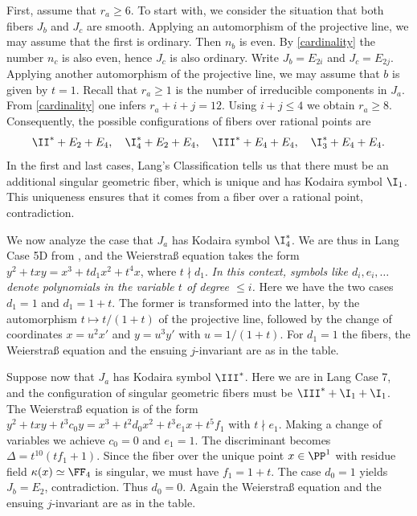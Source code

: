 First, assume that $r_a\geq 6$.
To start with, we consider the situation that both fibers $J_b$ and $J_c$ are smooth.
Applying an automorphism of the projective line, we may assume that the first is ordinary. Then $n_b$ is even.
By \eqref{cardinality} the number $n_c$ is also even, hence $J_c$ is also ordinary.
Write  $J_b=E_{2i}$ and $J_c=E_{2j}$. Applying another automorphism of the projective line,  we may assume
that $b$ is given by $t=1$. Recall that $r_a\geq 1$ is the number of irreducible components in $J_a$.
 From \eqref{cardinality} one infers $r_a+i+j=12$.
Using $i+j\leq 4$ we obtain $r_a\geq 8$.
Consequently, the possible configurations of   fibers over rational points are
$$
\II^*+E_2+E_4,\quad \I_4^*+E_2+E_4,\quad \III^*+E_4+E_4,\quad \I_3^*+E_4+E_4.
$$
In the first and last cases, Lang's Classification \cite{Lang-2000} tells us that
there must be an additional singular geometric fiber, which is unique and has Kodaira symbol $\I_1$.
This uniqueness ensures that it comes from a  fiber over a rational point, contradiction.

We now analyze the case that $J_a$ has Kodaira symbol $\I_4^*$.
We are thus in Lang Case 5D from \cite{Lang-2000}, and the Weierstra\ss{} equation takes the form
$y^2+txy=x^3+td_1x^2+t^4x$, where $t\nmid d_1$.
\emph{In this context, symbols like $d_i,e_i,\ldots$ denote   polynomials in the variable $t$ of degree $\leq i$.}
Here we have the two cases $d_1=1$ and $d_1=1+t$. The former is transformed into the latter,
by the automorphism $t\mapsto t/(1+t)$ of the projective line,  followed by the change of coordinates
$x=u^2x'$ and $y=u^3y'$ with $u=1/(1+t)$.
For $d_1=1$ the fibers, the  Weierstra\ss{} equation and the ensuing $j$-invariant are as in the table.

Suppose now that $J_a$ has Kodaira symbol $\III^*$.
Here we are in Lang Case 7,
and the configuration of singular geometric fibers  must
be $\III^*+\I_1+\I_1$. The Weierstra\ss{} equation is of the form
$y^2+txy+t^3c_0y=x^3+t^2d_0x^2+ t^3e_1x+t^5f_1$ with $t\nmid e_1$.
Making a change of variables we achieve $c_0=0$ and $e_1=1$.
The discriminant becomes $\Delta=t^{10}(tf_1+1)$.
Since the fiber over  the unique point $x\in\PP^1$ with residue field $\kappa(x)\simeq \FF_4$
is singular, we must have $f_1=1+t$.
The case $d_0=1$ yields $J_b=E_2$, contradiction. Thus $d_0=0$.
Again the Weierstra\ss{} equation and the ensuing $j$-invariant are as in the table.

